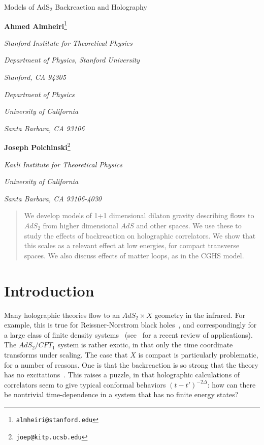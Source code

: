 \documentclass[12pt]{article}
\newcommand{\sect}[1]{\section{#1}\setcounter{equation}{0}}
\begin{document}

\begin{titlepage}
\bigskip
\bigskip\bigskip\bigskip
\centerline{\Large  Models of AdS$_2$ Backreaction and Holography}
\bigskip\bigskip\bigskip
 \centerline{{\bf Ahmed Almheiri}\footnote{\tt almheiri@stanford.edu}}
\medskip
\centerline{\em Stanford Institute for Theoretical Physics}
\centerline{\em Department of Physics, Stanford University}
\centerline{\em Stanford, CA 94305}
\bigskip 
\centerline{\em Department of Physics}
\centerline{\em University of California}
\centerline{\em Santa Barbara, CA 93106}\bigskip
\bigskip
 \centerline{{\bf Joseph Polchinski}\footnote{\tt joep@kitp.ucsb.edu}}
\medskip
\centerline{\em Kavli Institute for Theoretical Physics}
\centerline{\em University of California}
\centerline{\em Santa Barbara, CA 93106-4030}\bigskip
\bigskip
\bigskip\bigskip

\begin{abstract}
We develop models of 1+1 dimensional dilaton gravity describing flows to $AdS_2$ from higher dimensional $AdS$ and other spaces.  We use these to study the effects of backreaction on holographic correlators.  We show that this scales as a relevant effect at low energies, for compact transverse spaces.  We also discuss effects of matter loops, as in the CGHS model.
\end{abstract}
\end{titlepage}

\newpage
\tableofcontents


\setcounter{footnote}{0}

\newpage

\sect{Introduction}

Many holographic theories flow to an $AdS_2 \times X$ geometry in the infrared.  For example, this is true for Reissner-Norstrom black holes~\cite{BR}, and correspondingly for a large class of finite density systems~\cite{Chamblin:1999tk} (see~\cite{Iqbal:2011in} for a recent review of applications).  The $AdS_2/CFT_1$ system is rather exotic, in that only the time coordinate transforms under scaling.  The case that $X$ is compact is particularly problematic, for a number of reasons.  One is that the backreaction is so strong that the theory has no excitations~\cite{Maldacena:1998uz}.  This raises a puzzle, in that holographic calculations of correlators seem to give typical conformal behaviors $(t-t')^{-2\Delta}$: how can there be nontrivial time-dependence in a system that has no finite energy states?
\end{document}

